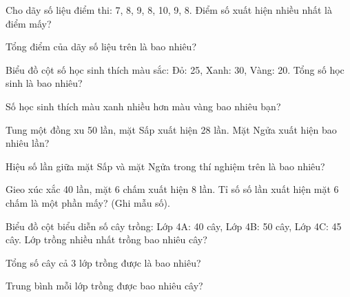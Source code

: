 \begin{ex}
Cho dãy số liệu điểm thi: 7, 8, 9, 8, 10, 9, 8. Điểm số xuất hiện nhiều nhất là điểm mấy?
\end{ex}

\begin{ex}
Tổng điểm của dãy số liệu trên là bao nhiêu?
\end{ex}

\begin{ex}
Biểu đồ cột số học sinh thích màu sắc: Đỏ: 25, Xanh: 30, Vàng: 20. Tổng số học sinh là bao nhiêu?
\end{ex}

\begin{ex}
Số học sinh thích màu xanh nhiều hơn màu vàng bao nhiêu bạn?
\end{ex}

\begin{ex}
Tung một đồng xu 50 lần, mặt Sấp xuất hiện 28 lần. Mặt Ngửa xuất hiện bao nhiêu lần?
\end{ex}

\begin{ex}
Hiệu số lần giữa mặt Sấp và mặt Ngửa trong thí nghiệm trên là bao nhiêu?
\end{ex}

\begin{ex}
Gieo xúc xắc 40 lần, mặt 6 chấm xuất hiện 8 lần. Tỉ số số lần xuất hiện mặt 6 chấm là một phần mấy? (Ghi mẫu số).
\end{ex}

\begin{ex}
Biểu đồ cột biểu diễn số cây trồng: Lớp 4A: 40 cây, Lớp 4B: 50 cây, Lớp 4C: 45 cây. Lớp trồng nhiều nhất trồng bao nhiêu cây?
\end{ex}

\begin{ex}
Tổng số cây cả 3 lớp trồng được là bao nhiêu?
\end{ex}

\begin{ex}
Trung bình mỗi lớp trồng được bao nhiêu cây?
\end{ex}

